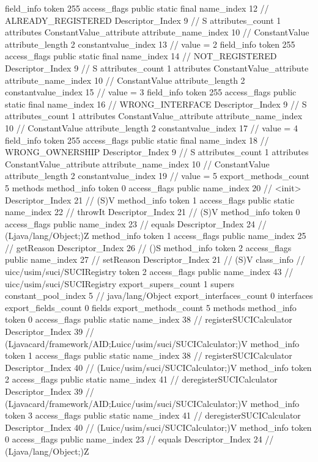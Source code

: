{{{{{{{				}
				}
			}
			field_info {
				token	255
				access_flags	public static final
				name_index	12		// ALREADY_REGISTERED
				Descriptor_Index	9		// S
				attributes_count	1
				attributes {
				ConstantValue_attribute {
					attribute_name_index	10		// ConstantValue
					attribute_length	2
					constantvalue_index	13		// value = 2
				}
				}
			}
			field_info {
				token	255
				access_flags	public static final
				name_index	14		// NOT_REGISTERED
				Descriptor_Index	9		// S
				attributes_count	1
				attributes {
				ConstantValue_attribute {
					attribute_name_index	10		// ConstantValue
					attribute_length	2
					constantvalue_index	15		// value = 3
				}
				}
			}
			field_info {
				token	255
				access_flags	public static final
				name_index	16		// WRONG_INTERFACE
				Descriptor_Index	9		// S
				attributes_count	1
				attributes {
				ConstantValue_attribute {
					attribute_name_index	10		// ConstantValue
					attribute_length	2
					constantvalue_index	17		// value = 4
				}
				}
			}
			field_info {
				token	255
				access_flags	public static final
				name_index	18		// WRONG_OWNERSHIP
				Descriptor_Index	9		// S
				attributes_count	1
				attributes {
				ConstantValue_attribute {
					attribute_name_index	10		// ConstantValue
					attribute_length	2
					constantvalue_index	19		// value = 5
				}
				}
			}
			}
			export_methods_count	5
			methods {
				method_info {
					token	0
					access_flags	public
					name_index	20		// <init>
					Descriptor_Index	21		// (S)V
				}
				method_info {
					token	1
					access_flags	public static
					name_index	22		// throwIt
					Descriptor_Index	21		// (S)V
				}
				method_info {
					token	0
					access_flags	public
					name_index	23		// equals
					Descriptor_Index	24		// (Ljava/lang/Object;)Z
				}
				method_info {
					token	1
					access_flags	public
					name_index	25		// getReason
					Descriptor_Index	26		// ()S
				}
				method_info {
					token	2
					access_flags	public
					name_index	27		// setReason
					Descriptor_Index	21		// (S)V
				}
			}
		}
		class_info {		// uicc/usim/suci/SUCIRegistry
			token	2
			access_flags	public
			name_index	43		// uicc/usim/suci/SUCIRegistry
			export_supers_count	1
			supers {
				constant_pool_index	5		// java/lang/Object
			}
			export_interfaces_count	0
			interfaces {
			}
			export_fields_count	0
			fields {
			}
			export_methods_count	5
			methods {
				method_info {
					token	0
					access_flags	public static
					name_index	38		// registerSUCICalculator
					Descriptor_Index	39		// (Ljavacard/framework/AID;Luicc/usim/suci/SUCICalculator;)V
				}
				method_info {
					token	1
					access_flags	public static
					name_index	38		// registerSUCICalculator
					Descriptor_Index	40		// (Luicc/usim/suci/SUCICalculator;)V
				}
				method_info {
					token	2
					access_flags	public static
					name_index	41		// deregisterSUCICalculator
					Descriptor_Index	39		// (Ljavacard/framework/AID;Luicc/usim/suci/SUCICalculator;)V
				}
				method_info {
					token	3
					access_flags	public static
					name_index	41		// deregisterSUCICalculator
					Descriptor_Index	40		// (Luicc/usim/suci/SUCICalculator;)V
				}
				method_info {
					token	0
					access_flags	public
					name_index	23		// equals
					Descriptor_Index	24		// (Ljava/lang/Object;)Z
				}
			}
		}
	}
}
